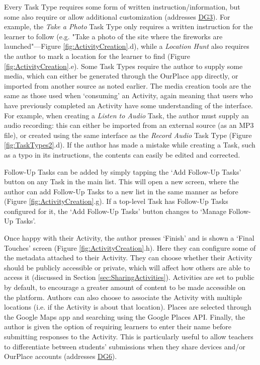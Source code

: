 Every Task Type requires some form of written instruction/information, but some also require or allow additional customization (addresses \hyperref[DG3]{DG3}). For example, the \textit{Take a Photo} Task Type only requires a written instruction for the learner to follow (e.g. "Take a photo of the site where the fireworks are launched"---Figure \ref{fig:ActivityCreation}.d), while a \textit{Location Hunt} also requires the author to mark a location for the learner to find (Figure \ref{fig:ActivityCreation}.e). Some Task Types require the author to supply some media, which can either be generated through the OurPlace app directly, or imported from another source as noted earlier. The media creation tools are the same as those used when `consuming' an Activity, again meaning that users who have previously completed an Activity have some understanding of the interface. For example, when creating a \textit{Listen to Audio} Task, the author must supply an audio recording: this can either be imported from an external source (as an MP3 file), or created using the same interface as the \textit{Record Audio} Task Type (Figure \ref{fig:TaskTypes2}.d). If the author has made a mistake while creating a Task, such as a typo in its instructions, the contents can easily be edited and corrected.

Follow-Up Tasks can be added by simply tapping the `Add Follow-Up Tasks' button on any Task in the main list. This will open a new screen, where the author can add Follow-Up Tasks to a new list in the same manner as before (Figure \ref{fig:ActivityCreation}.g). If a top-level Task has Follow-Up Tasks configured for it, the `Add Follow-Up Tasks' button changes to `Manage Follow-Up Tasks'.

Once happy with their Activity, the author presses `Finish' and is shown a `Final Touches' screen (Figure \ref{fig:ActivityCreation}.h). Here they can configure some of the metadata attached to their Activity. They can choose whether their Activity should be publicly accessible or private, which will affect how others are able to access it (discussed in Section \ref{sec:SharingActivities}). Activities are set to public by default, to encourage a greater amount of content to be made accessible on the platform. Authors can also choose to associate the Activity with multiple locations (i.e. if the Activity is about that location). Places are selected through the Google Maps app and searching using the Google Places API. Finally, the author is given the option of requiring learners to enter their name before submitting responses to the Activity. This is particularly useful to allow teachers to differentiate between students' submissions when they share devices and/or OurPlace accounts (addresses \hyperref[DG6]{DG6}).

